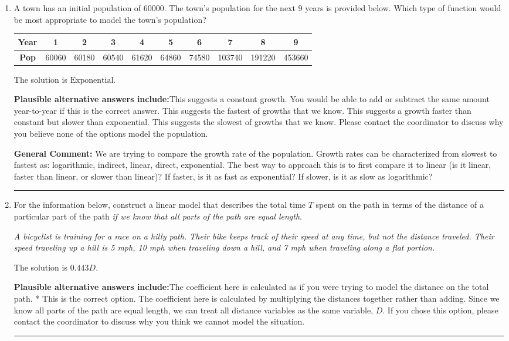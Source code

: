 \documentclass{extbook}[14pt]
\newcommand{\litem}[1]{\item #1

\rule{\textwidth}{0.4pt}}
\begin{document}
\begin{enumerate}\litem{
A town has an initial population of 60000. The town's population for the next 9 years is provided below. Which type of function would be most appropriate to model the town's population?


\begin{tabular}{c|c|c|c|c|c|c|c|c|c}
\textbf{Year} &1 &2 &3 &4 &5 &6 &7 &8 &9\tabularnewline \hline
\textbf{Pop} &60060 &60180 &60540 &61620 &64860 &74580 &103740 &191220 &453660\end{tabular}The solution is \( \text{Exponential} \).\begin{enumerate}[label=\Alph*.]
\textbf{Plausible alternative answers include:}This suggests a constant growth. You would be able to add or subtract the same amount year-to-year if this is the correct answer.
This suggests the fastest of growths that we know.
This suggests a growth faster than constant but slower than exponential.
This suggests the slowest of growths that we know.
Please contact the coordinator to discuss why you believe none of the options model the population.
\end{enumerate}

\textbf{General Comment:} We are trying to compare the growth rate of the population. Growth rates can be characterized from slowest to fastest as: logarithmic, indirect, linear, direct, exponential. The best way to approach this is to first compare it to linear (is it linear, faster than linear, or slower than linear)? If faster, is it as fast as exponential? If slower, is it as slow as logarithmic?
}
\litem{
For the information below, construct a linear model that describes the total time $T$ spent on the path in terms of the distance of a particular part of the path \textit{if we know that all parts of the path are equal length}.

\begin{center}
    \textit{ A bicyclist is training for a race on a hilly path. Their bike keeps track of their speed at any time, but not the distance traveled. Their speed traveling up a hill is 5 mph, 10 mph when traveling down a hill, and 7 mph when traveling along a flat portion. }
\end{center}
The solution is \( 0.443 D \).\begin{enumerate}[label=\Alph*.]
\textbf{Plausible alternative answers include:}The coefficient here is calculated as if you were trying to model the distance on the total path.
* This is the correct option.
The coefficient here is calculated by multiplying the distances together rather than adding.
Since we know all parts of the path are equal length, we can treat all distance variables as the same variable, $D$.
If you chose this option, please contact the coordinator to discuss why you think we cannot model the situation.
\end{enumerate}

}
\end{enumerate}
\end{document}
